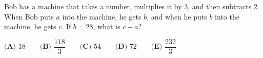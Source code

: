 Bob has a machine that takes a number, multiplies it by $3$, and then subtracts $2$. When Bob puts $a$ into the machine, he gets $b$, and when he puts $b$ into the machine, he gets $c$. If $b=28$, what is $c-a$?

$\textbf{(A) }18\qquad\textbf{(B) }\dfrac{118}{3}\qquad\textbf{(C) }54\qquad\textbf{(D) }72\qquad\textbf{(E) }\dfrac{232}{3}$
